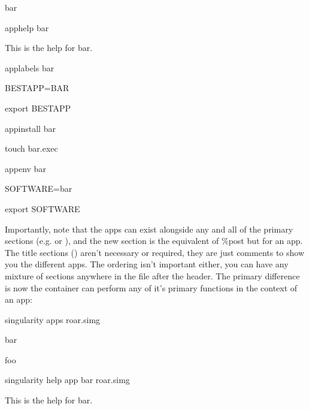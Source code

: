 \documentclass[letterpaper,10pt,english]{sphinxmanual}
\begin{document}
\begin{sphinxVerbatim}[commandchars=\\\{\}]
\PYGZsh{} bar

\PYGZsh{}\PYGZsh{}\PYGZsh{}\PYGZsh{}\PYGZsh{}\PYGZsh{}\PYGZsh{}\PYGZsh{}\PYGZsh{}\PYGZsh{}\PYGZsh{}\PYGZsh{}\PYGZsh{}\PYGZsh{}\PYGZsh{}\PYGZsh{}\PYGZsh{}\PYGZsh{}\PYGZsh{}\PYGZsh{}\PYGZsh{}\PYGZsh{}\PYGZsh{}\PYGZsh{}\PYGZsh{}\PYGZsh{}\PYGZsh{}\PYGZsh{}\PYGZsh{}\PYGZsh{}


\PYGZpc{}apphelp bar

    This is the help for bar.


\PYGZpc{}applabels bar

   BESTAPP=BAR

   export BESTAPP


\PYGZpc{}appinstall bar

    touch bar.exec


\PYGZpc{}appenv bar

    SOFTWARE=bar

    export SOFTWARE
\end{sphinxVerbatim}

Importantly, note that the apps can exist alongside any and all of the
primary sections (e.g.  or  ), and the new  section is the equivalent of
\%post but for an app. The title sections (\sphinxcode{\sphinxupquote{\#\#\#\#\#\#}}) aren’t necessary or
required, they are just comments to show you the different apps. The
ordering isn’t important either, you can have any mixture of sections
anywhere in the file after the header. The primary difference is now
the container can perform any of it’s primary functions in the context
of an app:


%
\begin{sphinxVerbatim}[commandchars=\\\{\}]
\PYGZdl{} singularity apps roar.simg

bar

foo
\end{sphinxVerbatim}


%
\begin{sphinxVerbatim}[commandchars=\\\{\}]
\PYGZdl{} singularity help \PYGZhy{}\PYGZhy{}app bar roar.simg

This is the help for bar.
\end{sphinxVerbatim}
\end{document}
